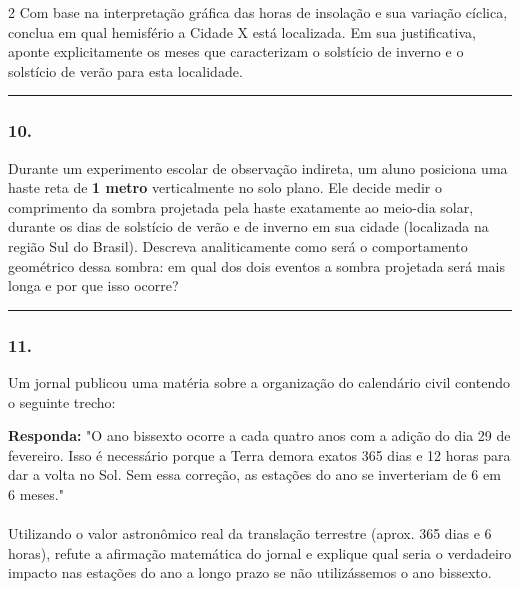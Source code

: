 \documentclass[twoside, 10pt, a4paper]{article}
\newlength{\espacoPreQuestao}
\newlength{\espacoQuestao}
\begin{document}
\begin{multicols*}{2}
Com base na interpretação gráfica das horas de insolação e sua variação cíclica, conclua em qual hemisfério a Cidade X está localizada. Em sua justificativa, aponte explicitamente os meses que caracterizam o solstício de inverno e o solstício de verão para esta localidade.
\par\vspace{\espacoQuestao}

\noindent\textcolor{CorLinha}{\rule{\linewidth}{0.5pt}} 
\par\vspace{\espacoPreQuestao}
\subsubsection*{10.} Durante um experimento escolar de observação indireta, um aluno posiciona uma haste reta de \textbf{1 metro} verticalmente no solo plano. Ele decide medir o comprimento da sombra projetada pela haste exatamente ao meio-dia solar, durante os dias de solstício de verão e de inverno em sua cidade (localizada na região Sul do Brasil). Descreva analiticamente como será o comportamento geométrico dessa sombra: em qual dos dois eventos a sombra projetada será mais longa e por que isso ocorre?
\par\vspace{\espacoQuestao}

\noindent\textcolor{CorLinha}{\rule{\linewidth}{0.5pt}} 
\par\vspace{\espacoPreQuestao}
\subsubsection*{11.} Um jornal publicou uma matéria sobre a organização do calendário civil contendo o seguinte trecho:

\begin{boxresponda}
\textbf{Responda:} "O ano bissexto ocorre a cada quatro anos com a adição do dia 29 de fevereiro. Isso é necessário porque a Terra demora exatos 365 dias e 12 horas para dar a volta no Sol. Sem essa correção, as estações do ano se inverteriam de 6 em 6 meses."\\
\\
Utilizando o valor astronômico real da translação terrestre (aprox. 365 dias e 6 horas), refute a afirmação matemática do jornal e explique qual seria o verdadeiro impacto nas estações do ano a longo prazo se não utilizássemos o ano bissexto.
\end{boxresponda}
\par\vspace{\espacoQuestao}


\end{multicols*}
\end{document}
